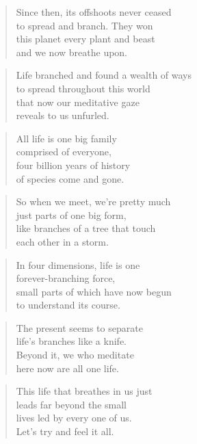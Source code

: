\documentclass[10pt,a4paper]{article}
\begin{document}
\begin{multicols}{2}
\begin{verse}
Since then, its offshoots never ceased\\
to spread and branch. They won\\
this planet every plant and beast\\
and we now breathe upon.
\end{verse}

\begin{verse}
Life branched and found a wealth of ways\\
to spread throughout this world\\
that now our meditative gaze\\
reveals to us unfurled.
\end{verse}

\begin{verse}
All life is one big family\\
comprised of everyone,\\
four billion years of history\\
of species come and gone.
\end{verse}

\begin{verse}
So when we meet, we’re pretty much\\
just parts of one big form,\\
like branches of a tree that touch\\
each other in a storm.
\end{verse}

\begin{verse}
In four dimensions, life is one\\
forever-branching force,\\
small parts of which have now begun\\
to understand its course.
\end{verse}

\begin{verse}
The present seems to separate\\
life’s branches like a knife.\\
Beyond it, we who meditate\\
here now are all one life.
\end{verse}

\begin{verse}
This life that breathes in us just\\
leads far beyond the small\\
lives led by every one of us.\\
Let’s try and feel it all.
\end{verse}


\end{multicols}
\end{document}
